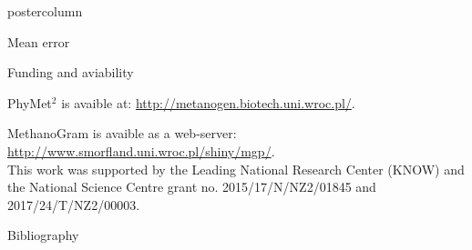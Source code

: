\documentclass[final]{beamer}\usepackage[]{graphicx}\usepackage[]{color}
\newenvironment{knitrout}{}{} %
\newenvironment{knitrout}{}{} %
\begin{document}
\begin{frame}
\begin{columns}
\begin{column}{.48\textwidth}
\begin{beamercolorbox}[center,wd=\textwidth]{postercolumn}
\begin{minipage}[T]{.95\textwidth}
{\begin{block}{Mean error}
\begin{knitrout}
{}



\end{knitrout}

% 
% 
% 
% 
% 



\end{block}
\vfill


\begin{block}{Funding and aviability}

PhyMet$^2$ is avaible at: \url{http://metanogen.biotech.uni.wroc.pl/}.

\bigskip

MethanoGram is avaible as a web-server: \url{http://www.smorfland.uni.wroc.pl/shiny/mgp/}.\\

\vfill
\small{This work was supported by the Leading National Research Center (KNOW) and the National Science Centre grant no. 2015/17/N/NZ2/01845 and 2017/24/T/NZ2/00003.}

\end{block}
\vfill

 \begin{block}{Bibliography}
  \tiny{
  
  
  }
  \end{block}
  \vfill  


}
\end{minipage}
\end{beamercolorbox}
\end{column}
\end{columns}  
\end{frame}
\end{document}
